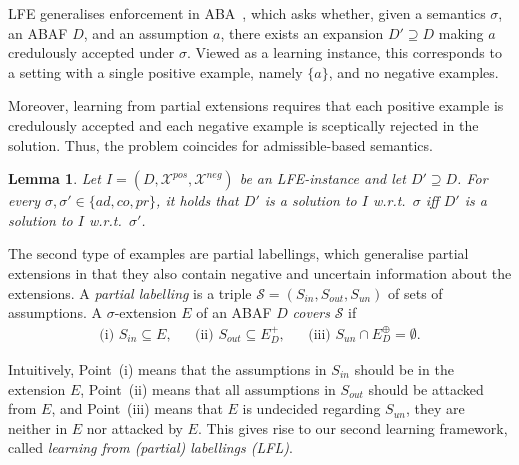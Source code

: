 \documentclass[letterpaper]{article} %
\newcommand{\TODO}[1]{\todo[inline]{ #1}}
\newcommand{\adm}{\textit{ad}}
\newcommand{\com}{\textit{co}}
\newcommand{\prf}{\textit{pr}}
\newcommand{\contrary}[1]{c(#1)}
\newcommand{\Xpos}{\mathcal{X}^{pos}}
\newcommand{\Xneg}{\mathcal{X}^{neg}}
\newtheorem{definition}[example]{Definition}
\newtheorem{lemma}[example]{Lemma}
\begin{document}
LFE generalises enforcement in ABA~\cite{RapbergerU23}, which asks whether, given a semantics $\sigma$, an ABAF $D$, and an assumption $a$, there exists an expansion $D'\supseteq D$ making $a$ credulously accepted under $\sigma$. Viewed as a learning instance, this corresponds to a setting with a single positive example, namely $\{a\}$, and no negative examples.

Moreover, learning from partial extensions requires that each positive example is credulously accepted and each negative example is sceptically rejected in the solution. Thus, the problem coincides for admissible-based semantics.
\begin{lemma}
\label{lem:admissible-based semantics coincide for LFE}
    Let $I=(D,\Xpos,\Xneg)$ be an LFE-instance and let $D'\supseteq D$. 
    For every $\sigma,\sigma'\in \{\adm,\com,\prf\}$, it holds that 
    $D'$ is a solution to $I$ w.r.t.\ $\sigma$ iff $D'$ is a solution to $I$ w.r.t.\ $\sigma'$.%
\end{lemma}



The second type of examples are partial labellings, which generalise partial extensions in that they also contain negative and uncertain information about the extensions. A \emph{partial labelling} is a triple $\mathcal S = (S_{in}, S_{out}, S_{un})$ of sets of assumptions. 
A $\sigma$-extension $E$ of an ABAF $D$ \emph{covers} $\mathcal S$ if
\begin{align*}
    \text{(i) } S_{in}\subseteq E, && \text{(ii) } S_{out}\subseteq E_D^+, && \text{(iii) } S_{un}\cap E^\oplus_D=\emptyset.
\end{align*}

Intuitively, Point~(i) means that the assumptions in $S_{in}$ should be in the extension $E$, Point~(ii) means that all assumptions in $S_{out}$ should be attacked
from $E$, and Point~(iii) means that $E$ is undecided regarding  $S_{un}$, they are neither in $E$ nor attacked by $E$.
This gives rise to our second learning framework, called \emph{learning from (partial) labellings (LFL)}.
\end{document}
